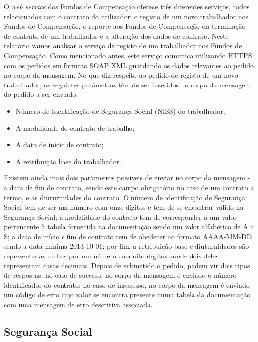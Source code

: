 \documentclass[sigplan]{acmart}
\begin{document}
O \textit{web service} dos Fundos de Compensação oferece três diferentes serviços, todos relacionados com o contrato do utilizador: o registo de um novo trabalhador nos Fundos de Compensação, o reporte aos Fundos de Compensação da terminação de contrato de um trabalhador e a alteração dos dados de contrato. Neste relatório vamos analisar o serviço de registo de um trabalhador nos Fundos de Compensação. Como mencionado antes, este serviço comunica utilizando HTTPS com os pedidos em formato SOAP XML guardando os dados relevantes ao pedido no corpo da mensagem. No que diz respeito ao pedido de registo de um novo trabalhador, os seguintes parâmetros têm de ser inseridos no corpo da mensagem do pedido a ser enviado:
\begin{itemize}
  \item Número de Identificação de Segurança Social (NISS) do trabalhador;
  \item A modalidade do contrato de trabalho;
  \item A data de início de contrato;
  \item A retribuição base do trabalhador.
\end{itemize}
Existem ainda mais dois parâmetros possíveis de enviar no corpo da mensagem - a data de fim de contrato, sendo este campo obrigatório no caso de um contrato a termo, e as diuturnidades do contrato. O número de identificação de Segurança Social tem de ser um número com onze dígitos e tem de se encontrar válido na Segurança Social; a modalidade do contrato tem de corresponder a um valor pertencente à tabela fornecida na documentação sendo um valor alfabético de A a S; a data de início e fim de contrato tem de obedecer ao formato AAAA-MM-DD sendo a data mínima 2013-10-01; por fim, a retribuição base e diuturnidades são representadas ambas por um número com oito dígitos aonde dois deles representam casas decimais. Depois de submetido o pedido, podem vir dois tipos de respostas; no caso de sucesso, no corpo da mensagem é enviado o número identificador do contrato; no caso de insucesso, no corpo da mensagem é enviado um código de erro cujo valor se encontra presente numa tabela da documentação com uma mensagem de erro descritiva associada.

\subsection{Segurança Social}
\end{document}
